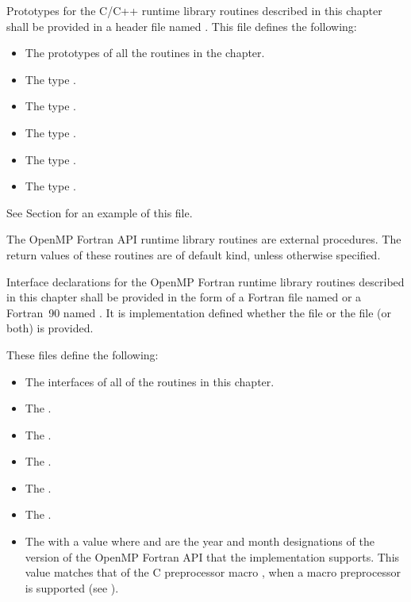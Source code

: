 Prototypes for the C/C++ runtime library routines described in this chapter shall be 
provided in a header file named . This file defines the following: 

\begin{itemize}
\item The prototypes of all the routines in the chapter. 

\item The type . 

\item The type .

\item The type . 

\item The type .

\item The type .
\end{itemize}

See Section  for an example of this file.
\ccppspecificend

\fortranspecificstart
The OpenMP Fortran API runtime library routines are external procedures. The return 
values of these routines are of default kind, unless otherwise specified.

Interface declarations for the OpenMP Fortran runtime library routines described in this 
chapter shall be provided in the form of a Fortran  file named  or 
a Fortran~90  named . It is implementation defined whether the 
 file or the  file (or both) is provided.

These files define the following:

\begin{itemize}
\item The interfaces of all of the routines in this chapter.

\item The   .

\item The   .

\item The   .

\item The   .

\item The   .

\item The    with a value  where  
and  are the year and month designations of the version of the OpenMP Fortran 
API that the implementation supports. This value matches that of the C preprocessor 
macro , when a macro preprocessor is supported (see 
).
\end{itemize}

